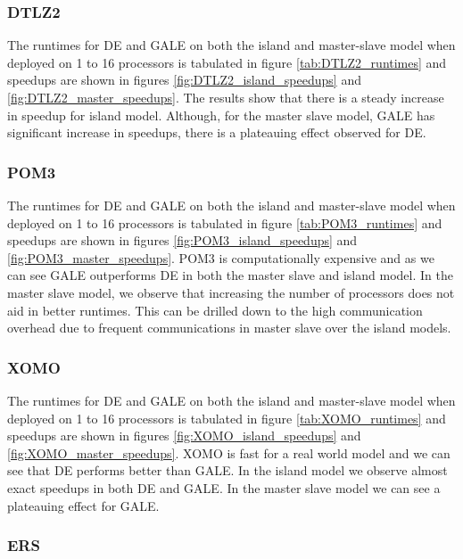 \documentclass[conference]{IEEEtran}
\begin{document}
	\subsubsection{DTLZ2}
	
	
	
	The runtimes for DE and GALE on both the island and master-slave model when deployed on 1 to 16 processors is tabulated in figure \ref{tab:DTLZ2_runtimes} and speedups are shown in figures \ref{fig:DTLZ2_island_speedups} and \ref{fig:DTLZ2_master_speedups}. The results show that there is a steady increase in speedup for island model. Although, for the master slave model, GALE has significant increase in speedups, there is a plateauing effect observed for DE.
	
	\subsubsection{POM3}
	
	
    
    The runtimes for DE and GALE on both the island and master-slave model when deployed on 1 to 16 processors is tabulated in figure \ref{tab:POM3_runtimes} and speedups are shown in figures \ref{fig:POM3_island_speedups} and \ref{fig:POM3_master_speedups}. POM3 is computationally expensive and as we can see GALE outperforms DE in both the master slave and island model. In the master slave model, we observe that increasing the number of processors does not aid in better runtimes. This can be drilled down to the high communication overhead due to frequent communications in master slave over the island models.
    
	
	\subsubsection{XOMO}
	
	
    
    The runtimes for DE and GALE on both the island and master-slave model when deployed on 1 to 16 processors is tabulated in figure \ref{tab:XOMO_runtimes} and speedups are shown in figures \ref{fig:XOMO_island_speedups} and \ref{fig:XOMO_master_speedups}. XOMO is fast for a real world model and we can see that DE performs better than GALE. In the island model we observe almost exact speedups in both DE and GALE. In the master slave model we can see a plateauing effect for GALE.
    
	\subsubsection{ERS}
	
\end{document}
